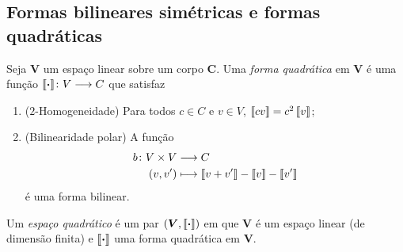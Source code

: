 \subsection{Formas bilineares simétricas e formas quadráticas}

\begin{definition}
Seja $\bm V$ um espaço linear sobre um corpo $\bm C$. Uma \emph{forma quadrática} em $\bm V$ é uma função ${\left\llbracket{\bm{\cdot}}\right\rrbracket}\colon {V} \longrightarrow {C}$ que satisfaz
	\begin{enumerate}
	\item ($2$-Homogeneidade) Para todos $c \in C$ e $v \in V$, $\left\llbracket{cv}\right\rrbracket = c^2 \left\llbracket{v}\right\rrbracket$;
	\item (Bilinearidade polar) A função
		\begin{align*}
		{b}\colon {V \times V} &\longrightarrow {C} \\{(v,v')} &\longmapsto \left\llbracket{v+v'}\right\rrbracket - \left\llbracket{v}\right\rrbracket - \left\llbracket{v'}\right\rrbracket
		\end{align*}
	é uma forma bilinear.
	\end{enumerate}
Um \emph{espaço quadrático} é um par $(\bm V,\left\llbracket{\bm{\cdot}}\right\rrbracket)$ em que $\bm V$ é um espaço linear (de dimensão finita) e $\left\llbracket{\bm{\cdot}}\right\rrbracket$ uma forma quadrática em $\bm V$.
\end{definition}

